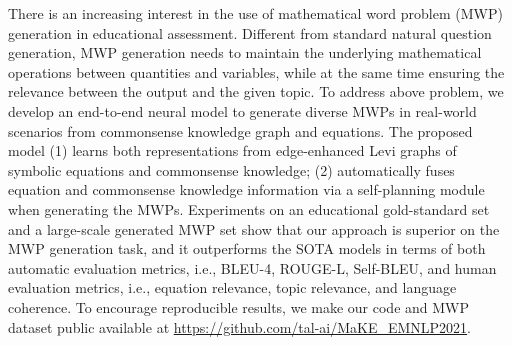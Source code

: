 There is an increasing interest in the use of mathematical word problem (MWP) generation in educational assessment. Different from standard natural question generation, MWP generation needs to maintain the underlying mathematical operations between quantities and variables, while at the same time ensuring the relevance between the output and the given topic. To address above problem, we develop an end-to-end neural model to generate diverse MWPs in real-world scenarios from commonsense knowledge graph and equations. The proposed model (1) learns both representations from edge-enhanced Levi graphs of symbolic equations and commonsense knowledge; (2) automatically fuses equation and commonsense knowledge information via a self-planning module when generating the MWPs. Experiments on an educational gold-standard set and a large-scale generated MWP set show that our approach is superior on the MWP generation task, and it outperforms the SOTA models in terms of both automatic evaluation metrics, i.e., BLEU-4, ROUGE-L, Self-BLEU, and human evaluation metrics, i.e., equation relevance, topic relevance, and language coherence. To encourage reproducible results, we make our code and MWP dataset public available at \url{https://github.com/tal-ai/MaKE\_EMNLP2021}.
